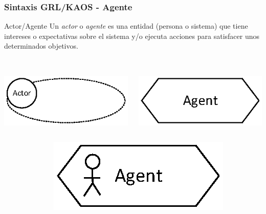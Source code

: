 \documentclass[slidestop,xcolor=pst,dvips,blue]{beamer}
\begin{document}
\begin{frame}[c]
    \frametitle{Sintaxis GRL/KAOS - Agente}
    \begin{block}{Actor/Agente}
        Un \alert{\emph{actor}} o \alert{\emph{agente}} es una entidad (persona o sistema) que tiene intereses o expectativas sobre el sistema y/o ejecuta acciones para satisfacer unos determinados objetivos.
        \ \\
        \ \\
        \begin{columns}[c]
            \begin{column}{0.50\linewidth}
                \centering \includegraphics[width=0.50\columnwidth,keepaspectratio=true]{images/objetivos/actor(GRL).eps}
            \end{column}
            \begin{column}{0.50\linewidth}
                \centering \includegraphics[width=0.50\columnwidth,keepaspectratio=true]{images/objetivos/agent(KAOS).eps}
            \end{column}
        \end{columns}
        \begin{columns}[c]
            \begin{column}{0.50\linewidth}
            \end{column}
            \begin{column}{0.50\linewidth}
                \centering \includegraphics[width=0.50\columnwidth,keepaspectratio=true]{images/objetivos/enviromentalAgent(KAOS).eps}
            \end{column}
        \end{columns}
     \end{block}
\end{frame}
\end{document}
